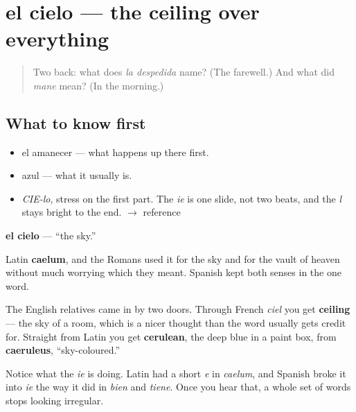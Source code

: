 \section[el cielo]{el cielo — the ceiling over everything}

\label{lesson:ES-C289-cielo}



\begin{quote}
Two back: what does \emph{la despedida} name? (The farewell.) And what did \emph{mane} mean? (In the morning.)
\end{quote}

\subsection*{What to know first}
\begin{itemize}
\raggedright
  \item el amanecer — what happens up there first.
  \item azul — what it usually is.
\end{itemize}

\begin{sounds}
\begin{itemize}
\raggedright
  \item \emph{CIE-lo}, stress on the first part. The \emph{ie} is one slide, not two beats, and the \emph{l} stays bright to the end. $\to$ reference
\end{itemize}
\end{sounds}

\begin{cousinweb}
\textbf{el cielo} — \textquotedblleft{}the sky.\textquotedblright{}

Latin \textbf{caelum}, and the Romans used it for the sky and for the vault of heaven without much worrying which they meant. Spanish kept both senses in the one word.

The English relatives came in by two doors. Through French \emph{ciel} you get \textbf{ceiling} — the sky of a room, which is a nicer thought than the word usually gets credit for. Straight from Latin you get \textbf{cerulean}, the deep blue in a paint box, from \textbf{caeruleus}, \textquotedblleft{}sky-coloured.\textquotedblright{}

Notice what the \emph{ie} is doing. Latin had a short \emph{e} in \emph{caelum}, and Spanish broke it into \emph{ie} the way it did in \emph{bien} and \emph{tiene}. Once you hear that, a whole set of words stops looking irregular.
\end{cousinweb}

